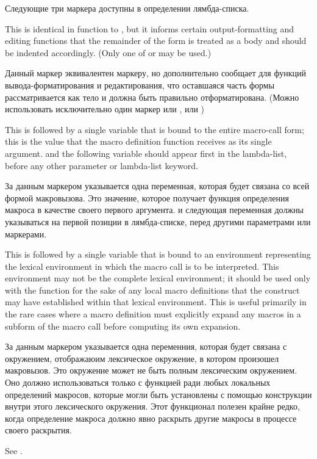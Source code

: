 \begin{defmac}
\begin{new}
Следующие три маркера доступны в определении лямбда-списка.
\end{new}
\begin{indentdesc}{6pc}
\item[\cd{\&body}]
This is identical in function to , but it informs certain
output-formatting and editing functions that the remainder of the form is
treated as a body and should be indented accordingly.
(Only one of  or  may be used.)

Данный маркер эквивалентен  маркеру, но дополнительно сообщает для
функций вывода-форматирования и редактирования, что оставшаяся часть формы
рассматривается как тело и должна быть правильно отформатирована.
(Можно использовать исключительно один маркер или , или )

\item[\cd{\&whole}]
This is followed by a single variable that is bound to the
entire macro-call form; this is the value that the macro definition function
receives as its single argument.
 and the following variable should appear first in the lambda-list,
before any other parameter or lambda-list keyword.

За данным маркером указывается одна переменная, которая будет связана со всей
формой макровызова. Это значение, которое получает функция определения макроса в
качестве своего первого аргумента.
 и следующая переменная должны указываться на первой позиции в
лямбда-списке, перед другими параметрами или маркерами.

\item[\cd{\&environment}]
This is followed by a single variable that is bound
to an environment representing the lexical environment in which the
macro call is to be interpreted.   This environment may not be the
complete lexical environment; it should be used only with
the function  for the sake of any local
macro definitions that the  construct may have
established within that lexical environment.  This is useful primarily
in the rare cases where a macro definition must explicitly expand any macros
in a subform of the macro call before computing its own expansion.

За данным маркером указывается одна переменния, которая будет связана с
окружением, отображаюим лексическое окружение, в котором произошел
макровызов. Это окружение может не быть полным лексическим окружением. Оно
должно использоваться только с функцией  ради любых локальных
определений макросов, которые могли быть установлены с помощью 
конструкции внутри этого лексического окружения. Этот функционал полезен крайне
редко, когда определение макроса должно явно раскрыть другие макросы в процессе
своего раскрытия.
\end{indentdesc}
See .


\end{defmac}
